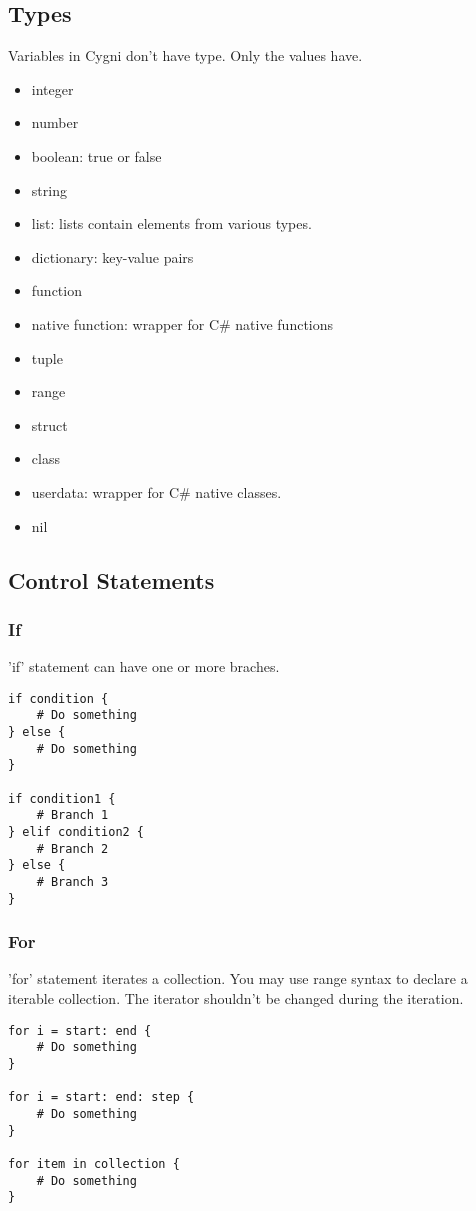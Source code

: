\documentclass[]{article}
\begin{document}
\subsection{Types}
Variables in Cygni don't have type. Only the values have.
\begin{itemize}
	\item integer
	\item number
	\item boolean: true or false
	\item string
	\item list: lists contain elements from various types.
	\item dictionary: key-value pairs
	\item function
	\item native function: wrapper for C\# native functions
	\item tuple
	\item range
	\item struct
	\item class
	\item userdata: wrapper for C\# native classes.
	\item nil
\end{itemize}

\subsection{Control Statements}
\subsubsection{If}
'if' statement can have one or more braches.
\begin{lstlisting}
if condition {
	# Do something
} else {
	# Do something
}

if condition1 {
	# Branch 1
} elif condition2 {
	# Branch 2
} else {
	# Branch 3
}
\end{lstlisting}

\subsubsection{For}
'for' statement iterates a collection. You may use range syntax to declare a iterable collection. The iterator shouldn't be changed during the iteration.

\begin{lstlisting}
for i = start: end {
	# Do something
}

for i = start: end: step {
	# Do something
}

for item in collection {
	# Do something
}
\end{lstlisting}
\end{document}

